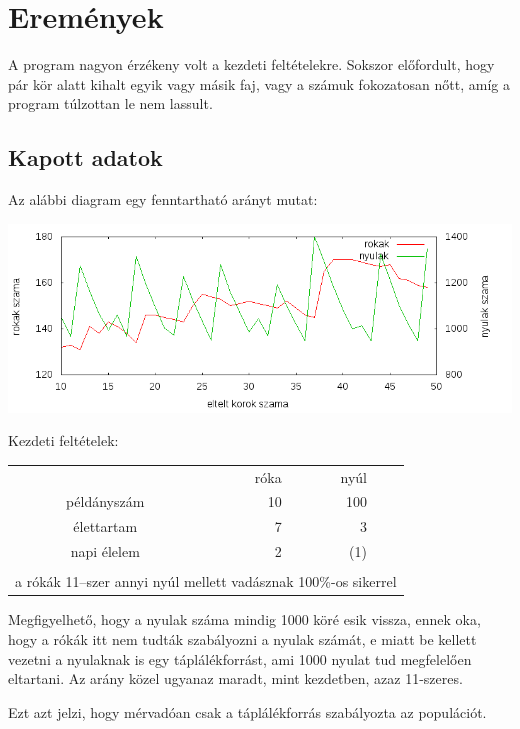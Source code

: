 \documentclass[twoside]{article}
\begin{document}
	\section*{Eremények}
		\par A program nagyon érzékeny volt a kezdeti feltételekre. Sokszor előfordult, hogy pár kör alatt kihalt egyik vagy másik faj, vagy a számuk fokozatosan nőtt, amíg a program túlzottan le nem lassult.
		\subsection*{Kapott adatok}	
		\par Az alábbi diagram egy fenntartható arányt mutat:
		\begin{center}
			\includegraphics[width = \textwidth]{../build/eredmenyek.png}
		\end{center}
		\par Kezdeti feltételek:
		\begin{center}
			\begin{tabular}{crrc}
				&róka&nyúl&\\
				példányszám&10&100&\\
				élettartam&7&3&\\
				napi élelem&2&(1)&\\
				&&&\\
				\multicolumn{4}{l}{a rókák 11--szer annyi nyúl mellett vadásznak 100\%-os sikerrel}\\
			\end{tabular}
		\end{center}
		\par Megfigyelhető, hogy a nyulak száma mindig 1000 köré esik vissza, ennek oka, hogy a rókák itt nem tudták szabályozni a nyulak számát, e miatt be kellett vezetni a nyulaknak is egy táplálékforrást, ami 1000 nyulat tud megfelelően eltartani. Az arány közel ugyanaz maradt, mint kezdetben, azaz 11-szeres.
		\par Ezt azt jelzi, hogy mérvadóan csak a táplálékforrás szabályozta az populációt.
		
\end{document}
